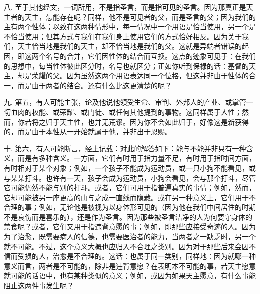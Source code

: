 八. 至于其他经文，一词所用，不是指圣言，而是指可见的圣言。因为那真正是天主者的天主，怎能存在呢？同样，他不是可见者的父，而是圣言的父；因为我们的主有两个性体；以致在这两种情形中，每一情况中一个用语是恰当使用，另一个是不恰当使用；但其方式与我们在我们身上使用它们的方式恰好相反。因为关于我们，天主恰当地是我们的天主，却不恰当地是我们的父。这就是异端者错误的起因，即这两个名号的合并，它们因性体的结合而互换。这点的迹象可见于：在我们的思想中，每当性体彼此区分时，名号也就区分；正如你听到保禄的话：基督的天主，却是荣耀的父。因为虽然这两个用语表达同一个位格，但这并非由于性体的合一，而是由于两者的结合。还有什么比这更清楚的呢？\par

九. 第五，有人可能主张，论及他说他领受生命、审判、外邦人的产业、或掌管一切血肉的权能、或荣耀、或门徒、或任何其他提到的事物。这同样属于人性；然而，你若将之归于天主性，也并无荒谬。因为你不会如此归于，好像这是新获得的，而是由于本性从一开始就属于他，并非出于恩赐。\par

十. 第六，有人可能断言，经上记载：对此的解答如下：能与不能并非只有一种含义，而是有多种含义。一方面，它们有时用于指力量不足，有时用于指时间方面，有时相对于某个对象；例如，一个孩子不能成为运动员，或一只小狗不能看见，或与某某打斗。也许有一天，孩子会成为运动员，小狗会看见，会与那个打斗，尽管它可能仍然不能与别的打斗。或者，它们可用于指普遍真实的事情；例如，然而，它却可能被另一座更高的山与之成一直线而隐藏。或在另一种意义上，它们用于不合理的事；例如，无论他是被视为以身体形可见的（因为他在我们中间居住的时期不是哀伤而是喜乐的），还是作为圣言。因为那些被圣言洁净的人为何要守身体的禁食呢？或者，它们又用于指违背意愿的事；例如，即那些应接受奇迹的人。因为为了治愈，既需要病人的信德，也需要医治者的能力，当两者之一缺乏时，另一个就不可能。不过，这个意义大概也应归入不合理之类别。因为对于那些后来会因不信而受损的人，治愈是不合理的。这话：也属于同一类别，同样地：因为就哪一种意义而言，两者是不可能的，除非是违背意愿？在表明本不可能的事，若天主愿意就可能的话语中，也有某种类似的意义；例如，或因为如果天主愿意，有什么事能阻止这两件事发生呢？\par

